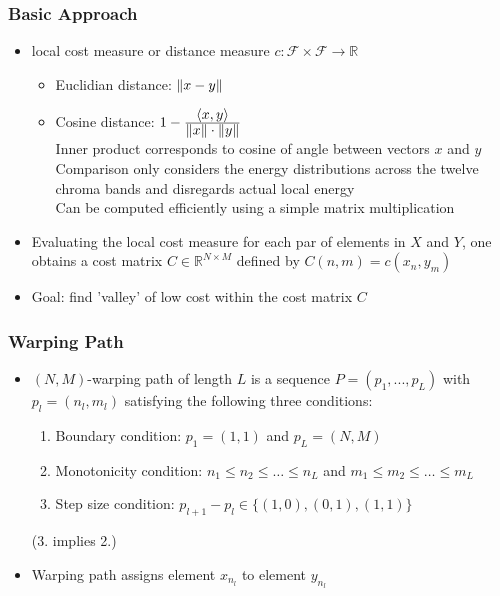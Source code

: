 \documentclass{scrartcl}
\DeclarePairedDelimiter\norm{\lVert}{\rVert}%
\DeclarePairedDelimiter\inner{\langle}{\rangle}%
\newcommand{\ffrac}[2]{\ensuremath{\frac{\displaystyle #1}{\displaystyle #2}}}
\begin{document}
\subsubsection*{Basic Approach}
\begin{itemize}
    \item
        local cost measure or distance measure $c:\mathcal{F} \times \mathcal{F} \rightarrow \mathbb{R}$     
        \begin{itemize}
            \item
                Euclidian distance: $\norm{x - y}$
            \item
                Cosine distance: $1 - \ffrac{\inner{x, y}}{\norm{x} \cdot \norm{y}}$\\
                Inner product corresponds to cosine of angle between vectors $x$ and $y$\\
                Comparison only considers the energy distributions across the twelve chroma bands and disregards actual local energy\\
                Can be computed efficiently using a simple matrix multiplication
        \end{itemize}
    \item
        Evaluating the local cost measure for each par of elements in $X$ and $Y$, one obtains a cost matrix $C \in \mathbb{R}^{N \times M}$ defined by
        $C(n,m) = c(x_n, y_m)$
    \item
        Goal: find 'valley' of low cost within the cost matrix $C$
\end{itemize}
\subsubsection*{Warping Path}
\begin{itemize}
    \item
        $(N,M)$-warping path of length $L$ is a sequence $P=(p_1, ..., p_L)$ with $p_l = (n_l, m_l)$ satisfying the following three conditions:
        \begin{enumerate}
            \item
                Boundary condition: $p_1 = (1,1)$ and $p_L = (N,M)$
            \item
                Monotonicity condition: $n_1 \leq n_2 \leq \dots \leq n_L$ and $m_1 \leq m_2 \leq \dots \leq m_L$
            \item
                Step size condition: $p_{l+1} - p_l \in \{(1,0), (0,1), (1,1)\}$
        \end{enumerate}
        (3. implies 2.)
    \item
        Warping path assigns element $x_{n_l}$ to element $y_{n_l}$
\end{itemize}
\end{document}
